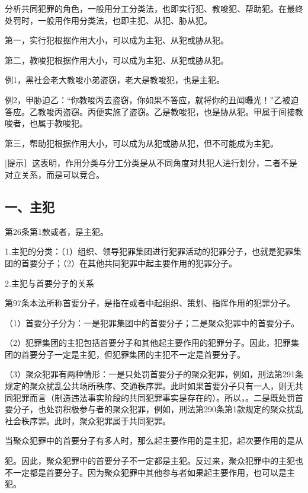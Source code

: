 分析共同犯罪的角色，一般用分工分类法，也即实行犯、教唆犯、帮助犯。在最终处罚时，一般用作用分类法，也即主犯、从犯、胁从犯。

第一，实行犯根据作用大小，可以成为主犯、从犯或胁从犯。

第二，教唆犯根据作用大小，可以成为主犯、从犯或胁从犯。

例1，黑社会老大教唆小弟盗窃，老大是教唆犯，也是主犯。

例2，甲胁迫乙：“你教唆丙去盗窃，你如果不答应，就将你的丑闻曝光！”乙被迫答应。乙教唆丙盗窃。丙便实施了盗窃。乙是教唆犯，也是胁从犯。甲属于间接教唆者，也属于教唆犯。

第三，帮助犯根据作用大小，可以成为从犯或胁从犯，但不可能成为主犯。

[提示］这表明，作用分类与分工分类是从不同角度对共犯人进行划分，二者不是对立关系，而是可以竞合。

\subsection*{一、主犯}

第26条第1款或者，是主犯。

1.主犯的分类：（1）组织、领导犯罪集团进行犯罪活动的犯罪分子，也就是犯罪集团的首要分子；（2）在其他共同犯罪中起主要作用的犯罪分子。

2.主犯与首要分子的关系

第97条本法所称首要分子，是指在或者中起组织、策划、指挥作用的犯罪分子。

（1）首要分子分为：一是犯罪集团中的首要分子；二是聚众犯罪中的首要分子。

（2）犯罪集团的主犯包括首要分子和其他起主要作用的犯罪分子。因此，犯罪集团的首要分子一定是主犯，但犯罪集团的主犯不一定是首要分子。

（3）聚众犯罪有两种情形：一是只处罚首要分子的聚众犯罪，例如，刑法第291条规定的聚众扰乱公共场所秩序、交通秩序罪。此时如果首要分子只有一人，则无共同犯罪而言（制造违法事实阶段的共同犯罪事实是存在的）。所以，。二是既处罚首要分子，也处罚积极参与者的聚众犯罪，例如，刑法第290条第1款规定的聚众扰乱社会秩序罪。此时，聚众犯罪属于共同犯罪。

当聚众犯罪中的首要分子有多人时，那么起主要作用的是主犯，起次要作用的是从

犯。因此，聚众犯罪中的首要分子不一定都是主犯。反过来，聚众犯罪中的主犯也不一定都是首要分子。因为聚众犯罪中其他参与者如果起主要作用，也可以是主犯。

